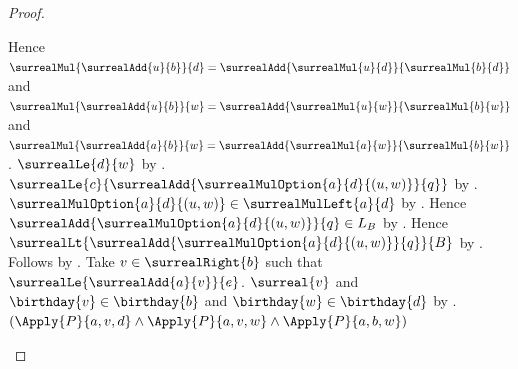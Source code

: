 \begin{proof}
\begin{subproof}
\begin{subproof}
\begin{byCase}
\begin{byCase}
                            Hence
                                $\surrealMul{\surrealAdd{u}{b}}{d}
                                    =\surrealAdd{\surrealMul{u}{d}}
                                        {\surrealMul{b}{d}}$ and
                                $\surrealMul{\surrealAdd{u}{b}}{w}
                                    =\surrealAdd{\surrealMul{u}{w}}
                                        {\surrealMul{b}{w}}$ and
                                $\surrealMul{\surrealAdd{a}{b}}{w}
                                    =\surrealAdd{\surrealMul{a}{w}}
                                        {\surrealMul{b}{w}}$.
                            $\surrealLe{d}{w}$
                                by .
                            $\surrealLe{c}
                                {\surrealAdd
                                    {\surrealMulOption{a}{d}{(u,w)}}{q}}$
                                by
                                .
                            $\surrealMulOption{a}{d}{(u,w)}
                                \in\surrealMulLeft{a}{d}$
                                by .
                            Hence $\surrealAdd
                                {\surrealMulOption{a}{d}{(u,w)}}{q}
                                \in L_B$
                                by .
                            Hence $\surrealLt
                                {\surrealAdd
                                    {\surrealMulOption{a}{d}{(u,w)}}{q}}
                                {B}$
                                by .
                            Follows by
                                .
                            Take $v\in\surrealRight{b}$ such that
                                $\surrealLe{\surrealAdd{a}{v}}{e}$.
                            $\surreal{v}$ and
                                $\birthday{v}\in\birthday{b}$ and
                                $\birthday{w}\in\birthday{d}$
                                by .
                            $(\Apply{P}{a,v,d}
                              \land\Apply{P}{a,v,w}
                              \land\Apply{P}{a,b,w})$

\end{byCase}
\end{byCase}
\end{subproof}
\end{subproof}
\end{proof}
